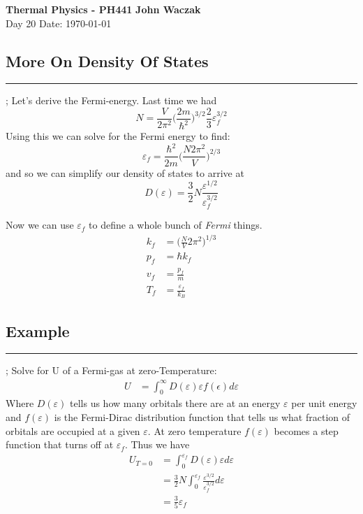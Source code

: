 \documentclass[a4paper, 11pt]{article}
\begin{document}
	\noindent
	\large\textbf{Thermal Physics - PH441} \hfill \textbf{John Waczak} \\
	\normalsize Day 20 \hfill  Date: \today \\
	
	
\subsection*{More On Density Of States}	
	\par\noindent\rule{\textwidth}{0.4pt};	
	Let's derive the Fermi-energy. Last time we had
		\begin{equation*}
			N = \frac{V}{2\pi^2}\Big(\frac{2m}{\hbar^2}\Big)^{3/2}\frac{2}{3}\varepsilon_f^{3/2}
		\end{equation*}
	Using this we can solve for the Fermi energy to find: 
		\begin{equation*}
			\varepsilon_f = \frac{\hbar^2}{2m}\Big(\frac{N2\pi^2}{V}\Big)^{2/3}
		\end{equation*}
	and so we can simplify our density of states to arrive at
		\begin{equation*}
			D(\varepsilon) = \frac{3}{2}N\frac{\varepsilon^{1/2}}{\varepsilon_f^{3/2}}
		\end{equation*}	
	
	\noindent Now we can use $\varepsilon_f$ to define a whole bunch of \textit{Fermi} things. 
		\begin{align*}
			k_f &= \Big(\frac{N}{V}2\pi^2\Big)^{1/3} \\ 
			p_f &= \hbar k_f \\ 
			v_f &= \frac{p_f}{m} \\ 
			T_f &= \frac{\varepsilon_f}{k_B}
		\end{align*}
		

\subsection*{Example}
	\par\noindent\rule{\textwidth}{0.4pt};	
	Solve for U of a Fermi-gas at zero-Temperature: 
		\begin{align*}
			U &= \int_0^\infty D(\varepsilon)\varepsilon f(\epsilon)d\varepsilon
		\end{align*}
	Where $D(\varepsilon)$ tells us how many orbitals there are at an energy $\varepsilon$ per unit energy and $f(\varepsilon)$ is the Fermi-Dirac distribution function that tells us what fraction of orbitals are occupied at a given $\varepsilon$. At zero temperature $f(\varepsilon)$ becomes a step function that turns off at $\varepsilon_f$. Thus we have 
		\begin{align*}
			U_{T = 0} &= \int_0^{\varepsilon_f} D(\varepsilon)\varepsilon d\varepsilon \\
			&= \frac{3}{2}N\int_0^{\varepsilon_f} \frac{\varepsilon^{3/2}}{\varepsilon_f^{3/2}}d\varepsilon \\ 
			&= \frac{3}{5}\varepsilon_f
		\end{align*}
		
\end{document}
